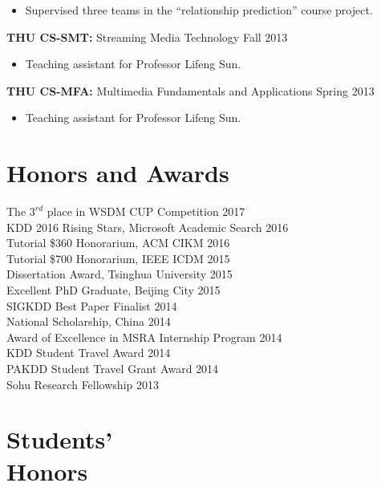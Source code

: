 \documentclass[margin, 9pt]{res}
\begin{document}
\begin{resume}
\begin{itemize}
\item Supervised three teams in the ``relationship prediction'' course project.
\end{itemize}
\vspace{-0.1in}
{\textbf{THU CS-SMT:} Streaming Media Technology} \hfill{Fall 2013}
\begin{itemize}
\item Teaching assistant for Professor Lifeng Sun.
\end{itemize}
\vspace{-0.1in}
{\textbf{THU CS-MFA:} Multimedia Fundamentals and Applications} \hfill{Spring 2013}
\begin{itemize}
\item Teaching assistant for Professor Lifeng Sun.
\end{itemize}


\section{Honors and Awards}

{The $3^{rd}$ place in WSDM CUP Competition} \hfill{2017} \\
{KDD 2016 Rising Stars, Microsoft Academic Search} \hfill{2016} \\
{Tutorial \$360 Honorarium, ACM CIKM} \hfill{2016} \\
{Tutorial \$700 Honorarium, IEEE ICDM} \hfill{2015} \\
{Dissertation Award, Tsinghua University} \hfill{2015} \\
{Excellent PhD Graduate, Beijing City} \hfill{2015} \\
{SIGKDD Best Paper Finalist} \hfill{2014} \\
{National Scholarship, China} \hfill{2014} \\
{Award of Excellence in MSRA Internship Program} \hfill{2014} \\
{KDD Student Travel Award} \hfill{2014} \\
{PAKDD Student Travel Grant Award} \hfill{2014} \\
{Sohu Research Fellowship} \hfill{2013}

\section{Students' \\ Honors}


\end{resume}
\end{document}
